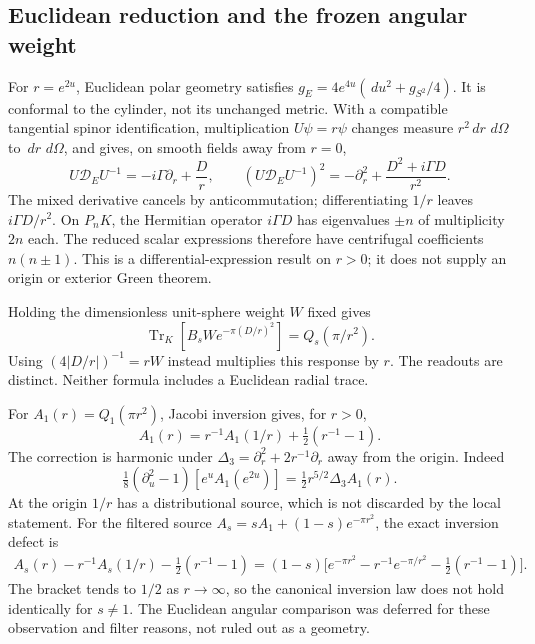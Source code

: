 \documentclass[11pt,letterpaper]{article}
\numberwithin{equation}{section}
\theoremstyle{remark}
\DeclareMathOperator{\Tr}{Tr}
\newcommand{\dd}{\,d}
\begin{document}
\subsection{Euclidean reduction and the frozen angular weight}

For \(r=e^{2u}\), Euclidean polar geometry satisfies
\(g_E=4e^{4u}(\dd u^2+g_{S^2}/4)\).
It is conformal to the cylinder, not its unchanged metric.
With a compatible tangential spinor identification, multiplication
\(U\psi=r\psi\) changes measure \(r^2\dd r\,\dd\Omega\) to
\(\dd r\,\dd\Omega\), and gives, on smooth fields away from \(r=0\),
\begin{equation}
 U\mathcal D_EU^{-1}=-i\Gamma\partial_r+\frac Dr,\qquad
 (U\mathcal D_EU^{-1})^2
 =-\partial_r^2+\frac{D^2+i\Gamma D}{r^2}.
 \label{eq:euclidean}
\end{equation}
The mixed derivative cancels by anticommutation; differentiating
\(1/r\) leaves \(i\Gamma D/r^2\).
On \(P_nK\), the Hermitian operator \(i\Gamma D\) has eigenvalues
\(\pm n\) of multiplicity \(2n\) each. The reduced scalar
expressions therefore have centrifugal coefficients \(n(n\pm1)\).
This is a differential-expression result on \(r>0\); it does not
supply an origin or exterior Green theorem.

Holding the dimensionless unit-sphere weight \(W\) fixed gives
\begin{equation}
 \Tr_K[B_s W e^{-\pi(D/r)^2}]=Q_s(\pi/r^2).
 \label{eq:frozen-sphere}
\end{equation}
Using \((4|D/r|)^{-1}=rW\) instead multiplies this response by \(r\).
The readouts are distinct. Neither formula includes a Euclidean
radial trace.

For \(A_1(r)=Q_1(\pi r^2)\), Jacobi inversion
\cite[equation 20.7.32]{DLMF} gives, for \(r>0\),
\begin{equation}
 A_1(r)=r^{-1}A_1(1/r)+\tfrac12(r^{-1}-1).
 \label{eq:jacobi}
\end{equation}
The correction is harmonic under
\(\Delta_3=\partial_r^2+2r^{-1}\partial_r\) away from the origin.
Indeed
\[
 \tfrac18(\partial_u^2-1)[e^uA_1(e^{2u})]
 =\tfrac12r^{5/2}\Delta_3 A_1(r).
\]
At the origin \(1/r\) has a distributional source, which is not
discarded by the local statement. For the filtered source
\(A_s=sA_1+(1-s)e^{-\pi r^2}\), the exact inversion defect is
\begin{align}
 A_s(r)-r^{-1}A_s(1/r)-\tfrac12(r^{-1}-1)
 =(1-s)\bigl[e^{-\pi r^2}-r^{-1}e^{-\pi/r^2}
                  -\tfrac12(r^{-1}-1)\bigr].
 \label{eq:filtered-inversion}
\end{align}
The bracket tends to \(1/2\) as \(r\to\infty\), so the canonical
inversion law does not hold identically for \(s\ne1\).
The Euclidean angular comparison was deferred for these observation
and filter reasons, not ruled out as a geometry.
\end{document}
